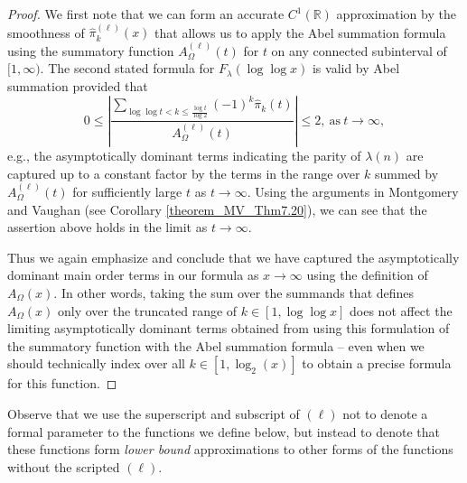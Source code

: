 \documentclass[11pt,reqno,a4letter]{article}
\numberwithin{figure}{section}
\numberwithin{table}{section}
\theoremstyle{plain}
\numberwithin{theorem}{section}
\theoremstyle{definition}
\begin{document}
\begin{proof} 
We first note that we can form an accurate $C^{1}(\mathbb{R})$ approximation by the smoothness of 
$\widehat{\pi}_k^{(\ell)}(x)$ that allows us to apply the Abel summation formula using the summatory 
function $A_{\Omega}^{(\ell)}(t)$ for $t$ on any connected subinterval of $[1, \infty)$. 
The second stated formula for $F_{\lambda}(\log\log x)$ is valid by Abel summation provided that 
\[
0 \leq \left\lvert \frac{\displaystyle\sum\limits_{\log\log t < k \leq \frac{\log t}{\log 2}} 
     (-1)^k \widehat{\pi}_k(t)}{A_{\Omega}^{(\ell)}(t)}\right\rvert \leq 2, 
     \mathrm{\ as\ } t \rightarrow \infty, 
\]
e.g., the asymptotically dominant terms indicating the parity of 
$\lambda(n)$ are captured up to a constant factor 
by the terms in the range over $k$ summed by 
$A_{\Omega}^{(\ell)}(t)$ for 
sufficiently large $t$ as $t \rightarrow \infty$. 
Using the arguments in Montgomery and Vaughan \cite[\S 7; Thm.\ 7.20]{MV} (see 
Corollary \ref{theorem_MV_Thm7.20}), we can see that 
the assertion above holds in the limit as $t \rightarrow \infty$. 

Thus we again emphasize and conclude that we have captured the 
asymptotically dominant main order terms in our formula as 
$x \rightarrow \infty$ using the definition of $A_{\Omega}(x)$. 
In other words, taking the sum over the summands that defines $A_{\Omega}(x)$ only over the truncated range of 
$k \in [1, \log\log x]$ does not affect the limiting asymptotically 
dominant terms obtained from using this formulation of the summatory function with the 
Abel summation formula -- even when we should technically 
index over all $k \in [1, \log_2(x)]$ to obtain a precise formula for this function. 
\end{proof} 

Observe that we use the superscript and subscript of $(\ell)$ not to denote a formal parameter to 
the functions we define below, but instead to denote that these functions form \emph{lower bound} 
approximations to other forms of the functions without the scripted $(\ell)$. 
\end{document}
